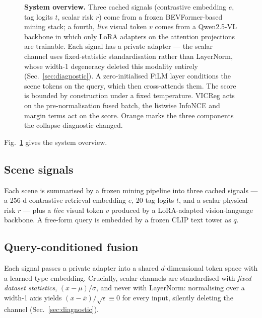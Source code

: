 \documentclass[10pt,twocolumn,letterpaper]{article}
\begin{document}
\begin{figure}[t]
{}
\caption{\textbf{System overview.} Three cached signals (contrastive
embedding $e$, tag logits $t$, scalar risk $r$) come from a frozen
BEVFormer-based mining stack; a fourth, \emph{live} visual token $v$ comes
from a Qwen2.5-VL backbone in which only LoRA adapters on the attention
projections are trainable. Each signal has a private adapter --- the scalar
channel uses fixed-statistic standardisation rather than LayerNorm, whose
width-1 degeneracy deleted this modality entirely
(Sec.~\ref{sec:diagnostic}). A zero-initialised FiLM layer conditions the
scene tokens on the query, which then cross-attends them. The score is
bounded by construction under a fixed temperature. VICReg acts on the
pre-normalisation fused batch, the listwise InfoNCE and margin terms act on
the score. Orange marks the three components the collapse diagnostic
changed.}
\label{fig:arch}
\end{figure}

Fig.~\ref{fig:arch} gives the system overview.

\subsection{Scene signals}
Each scene is summarised by a frozen mining pipeline into three cached
signals --- a 256-d contrastive retrieval embedding $e$, 20 tag logits
$t$, and a scalar physical risk $r$ --- plus a \emph{live} visual token
$v$ produced by a LoRA-adapted vision-language backbone. A free-form query
is embedded by a frozen CLIP text tower as $q$.

\subsection{Query-conditioned fusion}
Each signal passes a private adapter into a shared $d$-dimensional token
space with a learned type embedding. Crucially, scalar channels are
standardised with \emph{fixed dataset statistics}, $(x-\mu)/\sigma$, and
never with LayerNorm: normalising over a width-1 axis yields
$(x-\bar x)/\sqrt{\epsilon}\equiv 0$ for every input, silently deleting
the channel (Sec.~\ref{sec:diagnostic}).
\end{document}
